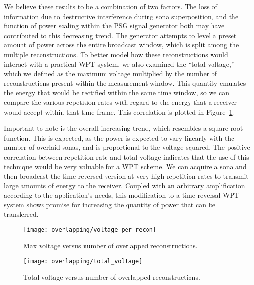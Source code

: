 We believe these results to be a combination of two factors. The loss of information due to destructive interference during sona superposition, and the function of power scaling within the PSG signal generator both may have contributed to this decreasing trend. The generator attempts to level a preset amount of power across the entire broadcast window, which is split among the multiple reconstructions.
To better model how these reconstructions would interact with a practical WPT system, we also examined the ``total \ptp{} voltage,'' which we defined as the maximum \ptp{} voltage multiplied by the number of reconstructions present within the measurement window. This quantity emulates the energy that would be rectified within the same time window, so we can compare the various repetition rates with regard to the energy that a receiver would accept within that time frame. This correlation is plotted in Figure~\ref{fig:overlapping-total-voltage}.

Important to note is the overall increasing trend, which resembles a square root function. This is expected, as the power is expected to vary linearly with the number of overlaid sonas, and is proportional to the \ptp{} voltage squared. The positive correlation between repetition rate and total voltage indicates that the use of this technique would be very valuable for a WPT scheme. We can acquire a sona and then broadcast the time reversed version at very high repetition rates to transmit large amounts of energy to the receiver. Coupled with an arbitrary amplification according to the application's needs, this modification to a time reversal WPT system shows promise for increasing the quantity of power that can be transferred.

\begin{figure}
\centering
\texttt{[image: overlapping/voltage\_per\_recon]}
\caption[Max \ptp{} voltage from overlapped reconstructions]{Max \ptp{} voltage versus number of overlapped reconstructions.}
\label{fig:overlapping-vpp}

\vspace*{\floatsep}%

\texttt{[image: overlapping/total\_voltage]}
\caption[Total \ptp{} voltage from overlapped reconstructions]{Total \ptp{} voltage versus number of overlapped reconstructions.}
\label{fig:overlapping-total-voltage}
\end{figure}

